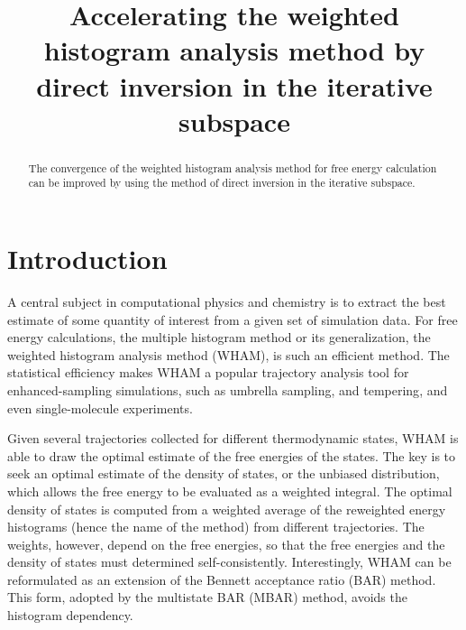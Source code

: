 \documentclass[reprint,aip,jcp,superscriptaddress]{revtex4-1}
\begin{document}
\newcommand{\vct}[1]{\mathbf{#1}}
\newcommand{\vx}{\vct{x}}
\newcommand{\vy}{\vct{y}}
\newcommand{\Z}{\mathcal{Z}}
\newcommand{\E}{\mathcal{E}}
\newcommand{\Ham}{\mathcal{H}}
\newcommand{\W}{\mathcal{W}}




\title{Accelerating the weighted histogram analysis method
by direct inversion in the iterative subspace}

\begin{abstract}
The convergence of the weighted histogram analysis method for free energy calculation
can be improved by using the method of direct inversion in the iterative subspace.
\end{abstract}

\maketitle




\section{Introduction}





A central subject in computational physics and chemistry
is to extract the best estimate of some quantity of interest
from a given set of simulation data.
%
For free energy calculations,
the multiple histogram method\cite{
ferrenberg1988, *ferrenberg1989,
newman, frenkel}
or its generalization,
the weighted histogram analysis method (WHAM)\cite{
kumar1992, roux1995,
bartels1997, *gallicchio2005, *habeck2007, *habeck2012,
souaille2001,
chodera2007, shirts2008, bereau2009,
hub2010, zhu2012},
is such an efficient method.
%
The statistical efficiency
makes WHAM a popular trajectory analysis tool
for enhanced-sampling simulations,
such as umbrella sampling\cite{
torrie1974, *laio2002},
and tempering\cite{
marinari1992, *lyubartsev1992,
swendsen1986, *geyer1991, *hukushima1996, *hansmann1997, *earl2005},
and even single-molecule experiments\cite{
shirts2008}.




Given several trajectories collected
for different thermodynamic states,
WHAM is able to draw the optimal estimate
of the free energies of the states.
%
The key is to seek an optimal estimate
of the density of states,
or the unbiased distribution,
which allows
the free energy to be evaluated
as a weighted integral.
%
The optimal density of states
is computed from a weighted average
of the reweighted energy histograms
(hence the name of the method)
from different trajectories.
%
The weights, however,
depend on the free energies,
so that
the free energies
and the density of states
must determined self-consistently.
%
Interestingly,
WHAM can be reformulated
as an extension
of the Bennett acceptance ratio (BAR) method\cite{
bennett1976}.
%
This form,
adopted by the multistate BAR (MBAR) method\cite{
shirts2008},
avoids the histogram dependency.
\end{document}
